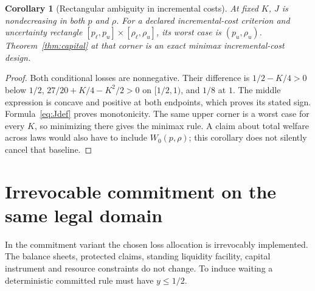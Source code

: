 \documentclass[11pt,a4paper]{article}
\numberwithin{equation}{section}
\newtheorem{corollary}[theorem]{Corollary}
\theoremstyle{definition}
\begin{document}
\begin{corollary}[Rectangular ambiguity in incremental costs]\label{cor:robust}
At fixed \(K\), \(J\) is nondecreasing in both \(p\) and \(\rho\).
For a declared incremental-cost criterion and uncertainty rectangle
\([p_\ell,p_u]\times[\rho_\ell,\rho_u]\), its worst case is
\((p_u,\rho_u)\). Theorem~\ref{thm:capital} at that corner is an exact
minimax incremental-cost design.
\end{corollary}
\begin{proof}
Both conditional losses are nonnegative. Their difference is
\(1/2-K/4>0\) below \(1/2\),
\(27/20+K/4-K^2/2>0\) on \([1/2,1)\), and \(1/8\) at \(1\).
The middle expression is concave and positive at both endpoints, which
proves its stated sign. Formula~\eqref{eq:Jdef} proves monotonicity.
The same upper corner is a worst case for every \(K\), so minimizing
there gives the minimax rule. A claim about total welfare across laws
would also have to include \(W_0(p,\rho)\); this corollary does not
silently cancel that baseline.
\end{proof}

\section{Irrevocable commitment on the same legal domain}\label{sec:commitment}

In the commitment variant the chosen loss allocation is irrevocably
implemented. The balance sheets, protected claims, standing liquidity
facility, capital instrument and resource constraints do not change.
To induce waiting a deterministic committed rule must have \(y\le1/2\).
\end{document}
